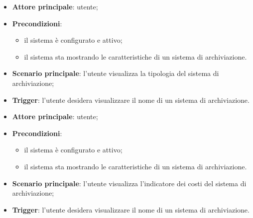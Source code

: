 \documentclass[10pt, a4paper]{article}
\begin{document}
    \begin{itemize}
        \item \textbf{Attore principale}: utente;
        \item \textbf{Precondizioni}:
            \begin{itemize}
                \item il sistema è configurato e attivo;
                \item il sistema sta mostrando le caratteristiche di un sistema di archiviazione.
            \end{itemize}
        \item \textbf{Scenario principale}: l'utente visualizza la tipologia del sistema di archiviazione;
        \item \textbf{Trigger}: l’utente desidera visualizzare il nome di un sistema di archiviazione.
    \end{itemize}

    \begin{itemize}
        \item \textbf{Attore principale}: utente;
        \item \textbf{Precondizioni}:
            \begin{itemize}
                \item il sistema è configurato e attivo;
                \item il sistema sta mostrando le caratteristiche di un sistema di archiviazione.
            \end{itemize}
        \item \textbf{Scenario principale}: l'utente visualizza l'indicatore dei costi del sistema di archiviazione;
        \item \textbf{Trigger}: l’utente desidera visualizzare il nome di un sistema di archiviazione.
    \end{itemize}
\end{document}
